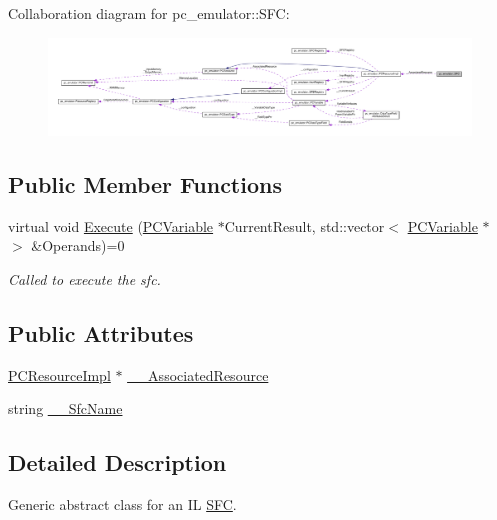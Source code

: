 Collaboration diagram for pc\+\_\+emulator\+:\+:S\+FC\+:
\nopagebreak
\begin{figure}[H]
\begin{center}
\leavevmode
\includegraphics[width=350pt]{classpc__emulator_1_1SFC__coll__graph}
\end{center}
\end{figure}
\subsection*{Public Member Functions}
\begin{DoxyCompactItemize}
\item 
virtual void \hyperlink{classpc__emulator_1_1SFC_ab206c80fc0e429c56672b4f6a0ca8635}{Execute} (\hyperlink{classpc__emulator_1_1PCVariable}{P\+C\+Variable} $\ast$Current\+Result, std\+::vector$<$ \hyperlink{classpc__emulator_1_1PCVariable}{P\+C\+Variable} $\ast$ $>$ \&Operands)=0
\begin{DoxyCompactList}\small\item\em Called to execute the sfc. \end{DoxyCompactList}\end{DoxyCompactItemize}
\subsection*{Public Attributes}
\begin{DoxyCompactItemize}
\item 
\hyperlink{classpc__emulator_1_1PCResourceImpl}{P\+C\+Resource\+Impl} $\ast$ \hyperlink{classpc__emulator_1_1SFC_ae1021fef00752f06a7c6e6641b3e913c}{\+\_\+\+\_\+\+Associated\+Resource}
\item 
string \hyperlink{classpc__emulator_1_1SFC_a7b295e456008cbf12323a2880220b33e}{\+\_\+\+\_\+\+Sfc\+Name}
\end{DoxyCompactItemize}


\subsection{Detailed Description}
Generic abstract class for an IL \hyperlink{classpc__emulator_1_1SFC}{S\+FC}. 


